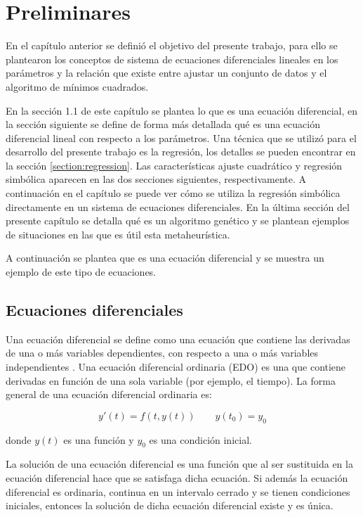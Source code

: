 \chapter{Preliminares}\label{chapter:preliminaries}

En el capítulo anterior se definió el objetivo del presente trabajo, para ello se plantearon los conceptos de sistema de ecuaciones diferenciales lineales en los parámetros y la relación que existe entre ajustar un conjunto de datos y el algoritmo de mínimos cuadrados.

En la sección 1.1 de este capítulo se plantea lo que es una ecuación diferencial, en la sección siguiente se define de forma más detallada qué es una ecuación diferencial lineal con respecto a los parámetros. Una técnica que se utilizó para el desarrollo del presente trabajo es la regresión, los detalles se pueden encontrar en la sección \ref{section:regression}. Las características ajuste cuadrático y regresión simbólica aparecen en las dos secciones siguientes, respectivamente. A continuación en el capítulo se puede ver cómo se utiliza la regresión simbólica directamente en un sistema de ecuaciones diferenciales. En la última sección del presente capítulo se detalla qué es un algoritmo genético y se plantean ejemplos de situaciones en las que es útil esta metaheurística.

A continuación se plantea que es una ecuación diferencial y se muestra un ejemplo de este tipo de ecuaciones.

\section{Ecuaciones diferenciales}

Una ecuación diferencial se define como una ecuación que contiene las derivadas de una o más variables dependientes, con respecto a una o más variables independientes \cite{gaucel2014learning}. Una ecuación diferencial ordinaria (EDO) es una que contiene derivadas en función de una sola variable (por ejemplo, el tiempo). La forma general de una ecuación diferencial ordinaria es:

$$y'(t)=f(t, y(t)) \qquad y(t_0) = y_0$$

donde $y(t)$ es una función y $y_0$ es una condición inicial.

La solución de una ecuación diferencial es una función que al ser sustituida en la ecuación diferencial hace que se satisfaga dicha ecuación. Si además la ecuación diferencial es ordinaria, continua en un intervalo cerrado y se tienen condiciones iniciales, entonces la solución de dicha ecuación diferencial existe y es única. \cite{coddington1955theory}

